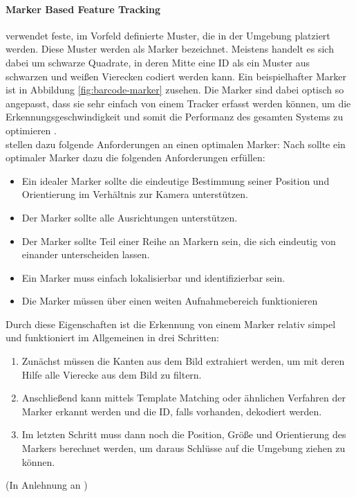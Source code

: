 \paragraph{Marker Based Feature Tracking} verwendet feste, im Vorfeld definierte Muster, die in der Umgebung platziert werden. Diese Muster werden als Marker bezeichnet. Meistens handelt es sich dabei um schwarze Quadrate, in deren Mitte eine ID als ein Muster aus schwarzen und weißen Vierecken codiert werden kann. Ein beispielhafter Marker ist in Abbildung \ref{fig:barcode-marker} zusehen.
Die Marker sind dabei optisch so angepasst, dass sie sehr einfach von einem Tracker erfasst werden können, um die Erkennungsgeschwindigkeit und somit die Performanz des gesamten Systems zu optimieren \citep[S. 28]{mehler-bicher:augmented-reality}.\\
\citeauthor{owen:fiducial-marker} stellen dazu folgende Anforderungen an einen optimalen Marker:
Nach \citet[S. 2]{owen:fiducial-marker} sollte ein optimaler Marker dazu die folgenden Anforderungen erfüllen:
\begin{itemize}
\item Ein idealer Marker sollte die eindeutige Bestimmung seiner Position und Orientierung im Verhältnis zur Kamera unterstützen.
\item Der Marker sollte alle Ausrichtungen unterstützen.
\item Der Marker sollte Teil einer Reihe an Markern sein, die sich eindeutig von einander unterscheiden lassen.
\item Ein Marker muss einfach lokalisierbar und identifizierbar sein.
\item Die Marker müssen über einen weiten Aufnahmebereich funktionieren
\end{itemize}
Durch diese Eigenschaften ist die Erkennung von einem Marker relativ simpel und funktioniert im Allgemeinen in drei Schritten:
\begin{enumerate}
\item Zunächst müssen die Kanten aus dem Bild extrahiert werden, um mit deren Hilfe alle Vierecke aus dem Bild zu filtern.
\item Anschließend kann mittels Template Matching oder ähnlichen Verfahren der Marker erkannt werden und die ID, falls vorhanden, dekodiert werden.
\item Im letzten Schritt muss dann noch die Position, Größe und Orientierung des Markers berechnet werden, um daraus Schlüsse auf die Umgebung ziehen zu können.
\end{enumerate}
(In Anlehnung an \citet[Kapitel 3.1]{cukovic:marker-vs-natural})

